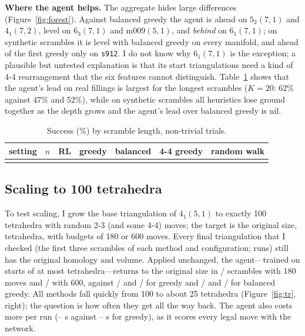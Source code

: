 \documentclass[10pt,a4paper]{article}
\begin{document}
\textbf{Where the agent helps.} The aggregate hides large differences (Figure~\ref{fig:forest}). Against balanced greedy the agent is ahead on $5_2(7,1)$ and $4_1(7,2)$, level on $6_3(7,1)$ and $\mathrm{m009}(5,1)$, and \emph{behind} on $6_1(7,1)$; on synthetic scrambles it is level with balanced greedy on every manifold, and ahead of the first greedy only on \texttt{s912}.
I do not know why $6_1(7,1)$ is the exception; a plausible but untested explanation is that its start triangulations need a kind of 4-4 rearrangement that the six features cannot distinguish. Table~\ref{tab:byk} shows that the agent's lead on real fillings is largest for the longest scrambles ($K=20$: 62\% against 47\% and 52\%), while on synthetic scrambles all heuristics lose ground together as the depth grows and the agent's lead over balanced greedy is nil.

\begin{table}[!t]
\centering\small
\begin{tabular}{@{}lcccccc@{}}\toprule
setting & $n$ & RL & greedy & balanced & 4-4 greedy & random walk\\\midrule
\\
\bottomrule\end{tabular}
\caption{Success (\%) by scramble length, non-trivial trials.}
\label{tab:byk}
\end{table}

\subsection{Scaling to 100 tetrahedra}
To test scaling, I grow the base triangulation of $4_1(5,1)$ to exactly 100 tetrahedra with random 2-3 (and some 4-4) moves; the target is the original size, \zsTarget{} tetrahedra, with budgets of 180 or 600 moves. Every final triangulation that I checked (the first three scrambles of each method and configuration; \chkOk{} runs) still has the original homology and volume.
Applied unchanged, the agent---trained on starts of at most \trMaxStart{} tetrahedra---returns to the original size in \zsRLa/\zsN{} scrambles with 180 moves and \zsRLb/\zsN{} with 600, against \zsGRa/\zsN{} and \zsGRb/\zsN{} for greedy and \zsGBa/\zsN{} and \zsGBb/\zsN{} for balanced greedy. All methods fall quickly from 100 to about 25 tetrahedra (Figure~\ref{fig:tr}, right); the question is how often they get all the way back. The agent also costs more per run (\zsSecsRLa--\zsSecsRLb{} s against \zsSecsGRa--\zsSecsGRb{} s for greedy), as it scores every legal move with the network.
\end{document}
